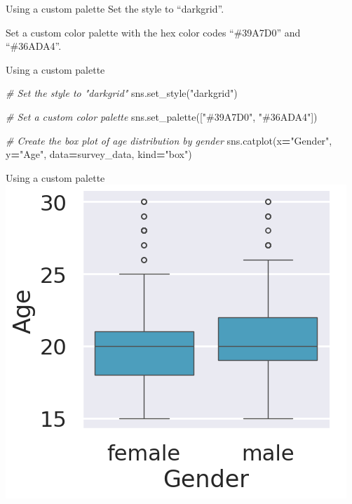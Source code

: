 \documentclass[
  ignorenonframetext,
]{beamer}
\newenvironment{Shaded}{\begin{snugshade}}{\end{snugshade}}
\newcommand{\CommentTok}[1]{\textcolor[rgb]{0.56,0.35,0.01}{\textit{#1}}}
\newcommand{\NormalTok}[1]{#1}
\newcommand{\OperatorTok}[1]{\textcolor[rgb]{0.81,0.36,0.00}{\textbf{#1}}}
\newcommand{\StringTok}[1]{\textcolor[rgb]{0.31,0.60,0.02}{#1}}
\begin{document}
\begin{frame}{Using a custom palette}
\label{using-a-custom-palette-3}
Set the style to ``darkgrid''.

Set a custom color palette with the hex color codes ``\#39A7D0'' and
``\#36ADA4''.
\end{frame}

\begin{frame}[fragile]{Using a custom palette}
\label{using-a-custom-palette-4}

\begin{Shaded}
\begin{Highlighting}[]
\CommentTok{\# Set the style to "darkgrid"}
\NormalTok{sns.set\_style(}\StringTok{"darkgrid"}\NormalTok{)}

\CommentTok{\# Set a custom color palette}
\NormalTok{sns.set\_palette([}\StringTok{"\#39A7D0"}\NormalTok{, }\StringTok{"\#36ADA4"}\NormalTok{])}

\CommentTok{\# Create the box plot of age distribution by gender}
\NormalTok{sns.catplot(x}\OperatorTok{=}\StringTok{"Gender"}\NormalTok{, y}\OperatorTok{=}\StringTok{"Age"}\NormalTok{, }
\NormalTok{            data}\OperatorTok{=}\NormalTok{survey\_data, kind}\OperatorTok{=}\StringTok{"box"}\NormalTok{)}
\end{Highlighting}
\end{Shaded}
\end{frame}

\begin{frame}{Using a custom palette}
\label{using-a-custom-palette-5}
\includegraphics{../images/im303.png}
\end{frame}
\end{document}
